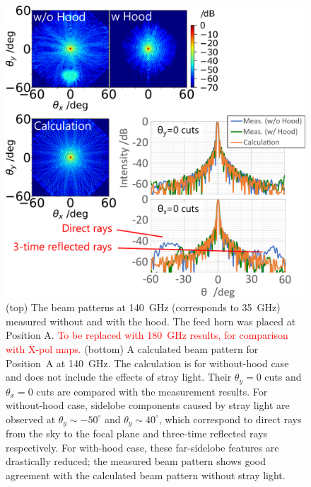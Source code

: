 \documentclass[journal]{IEEEtran}
\newcommand{\red}[1]{\textcolor{red}{#1}}
\begin{document}
\begin{figure}[!t]
\centering
\includegraphics[width=\linewidth]{Figures/Hood_F1_140G.pdf}
\caption{%
(top) The beam patterns at 140~GHz (corresponds to 35~GHz) measured without and with the hood. The feed horn was placed at Position A. \red{To be replaced with 180~GHz results, for comparison with X-pol maps.}
(bottom) A calculated beam pattern for Position~A at 140~GHz. The calculation is for without-hood case and does not include the effects of stray light.
Their $\theta_y = 0$ cuts and $\theta_x = 0$ cuts are compared with the measurement results. 
For without-hood case, sidelobe components caused by stray light are observed at $\theta_y \sim -50^\circ$ and $\theta_y \sim 40^\circ$, which correspond to direct rays from the sky to the focal plane and three-time reflected rays respectively. For with-hood case, these far-sidelobe features are drastically reduced; the measured beam pattern shows good agreement with the calculated beam pattern without stray light.
}
\label{fig:Hood_F1_140G}
\end{figure}
%
\end{document}
